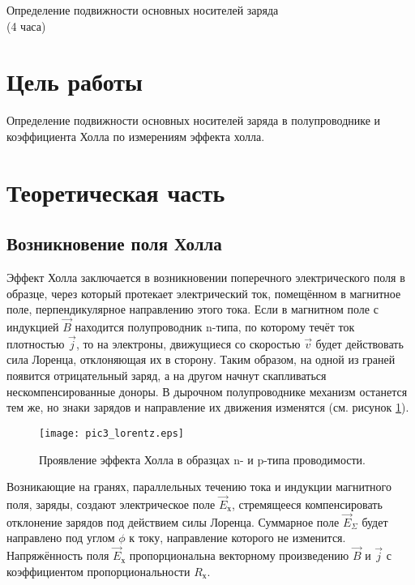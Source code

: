 \newpage

\setcounter{chapter}{3}

\begin{center}
Определение подвижности основных носителей заряда \\
(4 часа)
\end{center}

\section{Цель работы}
Определение подвижности основных носителей заряда в полупроводнике и коэффициента Холла по измерениям эффекта холла.

\section{Теоретическая часть}

\subsection{Возникновение поля Холла}

Эффект Холла заключается в возникновении поперечного электрического поля в образце, через который протекает электрический ток, помещённом в магнитное поле, перпендикулярное направлению этого тока. Если в магнитном поле с индукцией $\overrightarrow{B}$ находится полупроводник n-типа, по которому течёт ток плотностью $\overrightarrow{j}$, то на электроны, движущиеся со скоростью $\overrightarrow{v}$ будет действовать сила Лоренца, отклоняющая их в сторону. Таким образом, на одной из граней появится отрицательный заряд, а на другом начнут скапливаться нескомпенсированные доноры. В дырочном полупроводнике механизм останется тем же, но знаки зарядов и направление их движения изменятся (см. рисунок \ref{pic3_lorentz}).

\begin{figure}[h!]\centering
\texttt{[image: pic3\_lorentz.eps]}
\caption{Проявление эффекта Холла в образцах n- и p-типа проводимости.}
\label{pic3_lorentz}
\end{figure}

Возникающие на гранях, параллельных течению тока и индукции магнитного поля, заряды, создают электрическое поле $\overrightarrow{E}_{\text{х}}$, стремящееся компенсировать отклонение зарядов под действием силы Лоренца. Суммарное поле $\overrightarrow{E}_{\Sigma}$ будет направлено под углом $\phi$ к току, направление которого не изменится. Напряжённость поля $\overrightarrow{E}_{\text{х}}$ пропорциональна векторному произведению $\overrightarrow{B}$ и $\overrightarrow{j}$ с коэффициентом пропорциональности $R_{\text{х}}$.

